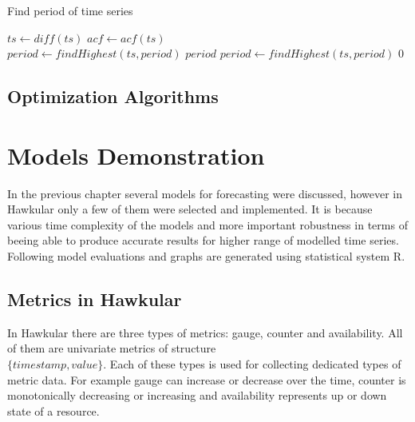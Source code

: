     \begin{algorithm}
        \caption{Find period of time series} \label{alg:period-find}
        \begin{algorithmic}[1]
             
                \State $ts \gets diff(ts)$ 
            \EndIf
            \State $acf \gets acf(ts)$ \\
            \State $period \gets findHighest(ts, period)$
                    \State \Return $period$
                \EndIf
                $period \gets findHighest(ts, period)$
            \EndWhile
            \State \Return $0$
        \EndFunction
        \end{algorithmic}
    \end{algorithm}

    \section{Optimization Algorithms}

\chapter{Models Demonstration}
In the previous chapter several models for forecasting were discussed, however in Hawkular only a few of them were
selected and implemented. It is because various time complexity of the models and more important robustness in terms of
beeing able to produce accurate results for higher range of modelled time series.
Following model evaluations and graphs are generated using statistical system R.

    \section{Metrics in Hawkular}
    In Hawkular there are three types of metrics: gauge, counter and availability. All of them are univariate metrics
    of structure \\$\{timestamp, value\}$. Each of these types is used for collecting dedicated types of metric data.
    For example gauge can increase or decrease over the time, counter is monotonically decreasing or increasing and
    availability represents up or down state of a resource.

